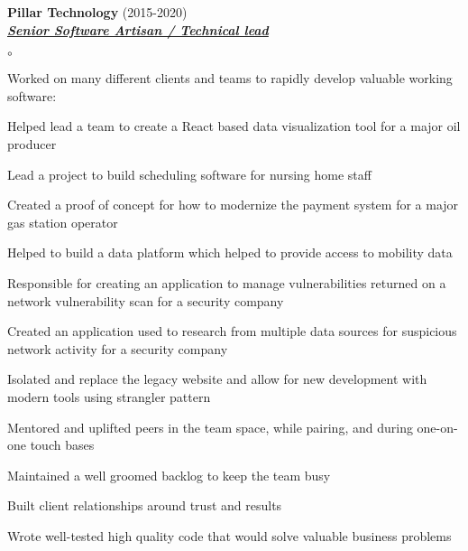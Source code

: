 \documentclass{article}
\newcommand{\employer}[3]{{ \textbf{#1} (#2)\\ \underline{\textbf{\emph{#3}}}\\  }}
\newenvironment{achievements}{\begin{list}{$\circ$}{\topsep 0pt \itemsep -2pt}}{\vspace*{4pt}\end{list}}
\begin{document}
\employer{Pillar Technology}{2015-2020}{Senior Software Artisan / Technical lead}
	\begin{achievements}
	\item Worked on many different clients and teams to rapidly develop valuable working software:
	\begin{list}
		\item Helped lead a team to create a React based data visualization tool for a major oil producer
		\item Lead a project to build scheduling software for nursing home staff
		\item Created a proof of concept for how to modernize the payment system for a major gas station operator
		\item Helped to build a data platform which helped to provide access to mobility data
		\item Responsible for creating an application to manage vulnerabilities returned on a network vulnerability scan for a security company
		\item Created an application used to research from multiple data sources for suspicious network activity for a security company
		\item Isolated and replace the legacy website and allow for new development with modern tools using strangler pattern
	\end{list}
	\item Mentored and uplifted peers in the team space, while pairing, and during one-on-one touch bases
	\item Maintained a well groomed backlog to keep the team busy
	\item Built client relationships around trust and results
	\item Wrote well-tested high quality code that would solve valuable business problems
	\end{achievements}
\end{document}
